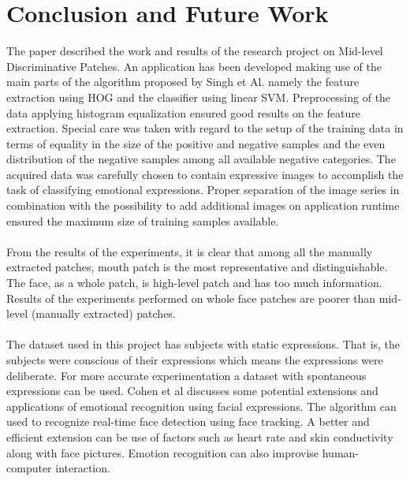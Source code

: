 \section{Conclusion and Future Work}

The paper described the work and results of the research project on Mid-level Discriminative Patches. An application has been developed making use of the main parts of the algorithm proposed by Singh et Al. \cite{Singh2012DiscPat} namely the feature extraction using HOG and the classifier using linear SVM. Preprocessing of the data applying histogram equalization ensured good results on the feature extraction. Special care was taken with regard to the setup of the training data in terms of equality in the size of the positive and negative samples and the even distribution of the negative samples among all available negative categories. The acquired data was carefully chosen to contain expressive images to accomplish the task of classifying emotional expressions. Proper separation of the image series in combination with the possibility to add additional images on application runtime ensured the maximum size of training samples available.
\\
\\
From the results of the experiments, it is clear that among all the manually extracted patches, mouth patch is the most representative and distinguishable. The face, as a whole patch, is high-level patch and has too much information. Results of the experiments performed on whole face patches are poorer than mid-level (manually extracted) patches. 
\\
\\
The dataset used in this project has subjects with static expressions. That is, the subjects were conscious of their expressions which means the expressions were deliberate. For more accurate experimentation a dataset with spontaneous expressions can be used. Cohen et al \cite{cohen2000emotion} discusses some potential extensions and applications of emotional recognition using facial expressions. The algorithm can used to recognize real-time face detection using face tracking. A better and efficient extension can be use of factors such as heart rate and skin conductivity along with face pictures. Emotion recognition can also improvise human-computer interaction. 

